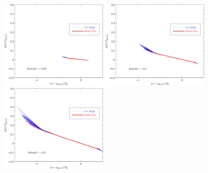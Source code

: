 \documentclass[a4paper,11pt]{article}
\def \halffigwidth{0.48\textwidth}
\begin{document}
\begin{figure}
  \includegraphics[width=\halffigwidth]{nobicep_spline0_p11_r0d02_potential_traj.pdf}%
  \includegraphics[width=\halffigwidth]{nobicep_spline0_p11_r0d1_potential_traj.pdf} 
  \includegraphics[width=\halffigwidth]{nobicep_spline0_p11_r0d2_potential_traj.pdf}

\end{figure}
\end{document}
